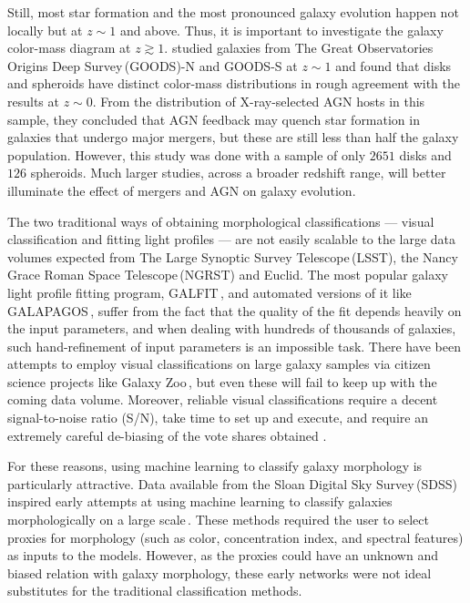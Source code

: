 Still, most star formation and the most pronounced galaxy evolution happen not locally but at $z\sim1$ and above. Thus, it is important to investigate the galaxy color-mass diagram at $z\gtrsim1$. \citet{powell_17} studied galaxies from The Great Observatories Origins Deep Survey\,(GOODS)-N and GOODS-S at $z\sim1$ and found that disks and spheroids have distinct color-mass distributions in rough agreement with the results at $z\sim0$. From the distribution of X-ray-selected AGN hosts in this sample, they concluded that AGN feedback may quench star formation in galaxies that undergo major mergers, but these are still less than half the galaxy population. However, this study was done with a sample of only $2651$ disks and $126$ spheroids. Much larger studies, across a broader redshift range, will better illuminate the effect of mergers and AGN on galaxy evolution. 

The two traditional ways of obtaining morphological classifications --- visual classification and fitting light profiles --- are not easily scalable to the large data volumes expected from The Large Synoptic Survey Telescope\,(LSST), the Nancy Grace Roman Space Telescope\,(NGRST) and Euclid. The most popular galaxy light profile fitting program, GALFIT\,\citep{galfit}, and automated versions of it like GALAPAGOS\,\citep{galapagos}, suffer from the fact that the quality of the fit depends heavily on the input parameters, and when dealing with hundreds of thousands of galaxies, such hand-refinement of input parameters is an impossible task. There have been attempts to employ visual classifications on large galaxy samples via citizen science projects like Galaxy Zoo\,\citep{gzoo_p1,gzoo_p2}, but even these will fail to keep up with the coming data volume. Moreover, reliable visual classifications require a decent signal-to-noise ratio (S/N), take time to set up and execute, and require an extremely careful de-biasing of the vote shares obtained \citep{gzoo_p1,gzoo_candels}. 

For these reasons, using machine learning to classify galaxy morphology is particularly attractive. Data available from the Sloan Digital Sky Survey\,(SDSS) inspired early attempts at using machine learning to classify galaxies morphologically on a large scale\,\citep[e.g.,][]{Ball2004GalaxyNetworks,Kelly2004MorphologicalSurvey,banerji_10}. These methods required the user to select proxies for morphology (such as color, concentration index, and spectral features) as inputs to the models. However, as the proxies could have an unknown and biased relation with galaxy morphology, these early networks were not ideal substitutes for the traditional classification methods. 

